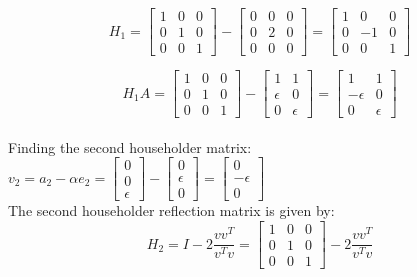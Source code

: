 \documentclass[12pt, oneside]{article}   	%
\begin{document}
\begin{enumerate}
\begin{enumerate}
		$$H_1=\left [\begin{array}{ccc} 1&0&0\\0&1&0\\0&0&1\end{array}\right]- \left [\begin{array}{ccc} 0&0&0\\0&2&0\\0&0&0\end{array}\right]= \left [\begin{array}{ccc} 1&0&0\\0&-1&0\\0&0&1\end{array}\right]$$
			
		
		$$H_1A=\left [\begin{array}{ccc} 1&0&0\\0&1&0\\0&0&1\end{array}\right]- \left [\begin{array}{cc} 1&1\\\epsilon&0\\0&\epsilon\end{array}\right]= \left [\begin{array}{cc} 1&1\\-\epsilon&0\\0&\epsilon\end{array}\right]$$\\
		
			Finding the second householder matrix:\\
			
		$v_2= a_2- \alpha e_2=\left [\begin{array}{c} 0\\0\\\epsilon\end{array}\right]- \left [\begin{array}{c} 0\\\epsilon\\
		0\end{array}\right]= \left [\begin{array}{c}0\\-\epsilon\\
		0\end{array}\right]$\\
		
		The second householder reflection matrix is given by:
		$$H_2=I - 2\frac{vv^T}{v^Tv}= \left [\begin{array}{ccc} 1&0&0\\0&1&0\\0&0&1\end{array}\right]-2\frac{vv^T}{v^Tv}$$\\
		

\end{enumerate}
\end{enumerate}
\end{document}
